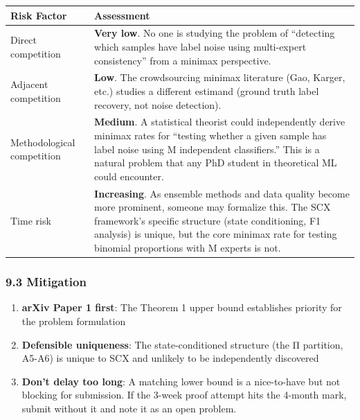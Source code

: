 \documentclass[
  12pt,
]{ctexart}
\providecommand{\tightlist}{%
  \setlength{\itemsep}{0pt}\setlength{\parskip}{0pt}}
\begin{document}
\begin{longtable}[]{@{}
  >{\raggedright\arraybackslash}p{}
  >{\raggedright\arraybackslash}p{}@{}}
\toprule\noalign{}
\begin{minipage}[b]{\linewidth}\raggedright
Risk Factor
\end{minipage} & \begin{minipage}[b]{\linewidth}\raggedright
Assessment
\end{minipage} \\
\midrule\noalign{}
\endhead
\bottomrule\noalign{}
\endlastfoot
Direct competition & \textbf{Very low}. No one is studying the problem
of ``detecting which samples have label noise using multi-expert
consistency'' from a minimax perspective. \\
Adjacent competition & \textbf{Low}. The crowdsourcing minimax
literature (Gao, Karger, etc.) studies a different estimand (ground
truth label recovery, not noise detection). \\
Methodological competition & \textbf{Medium}. A statistical theorist
could independently derive minimax rates for ``testing whether a given
sample has label noise using M independent classifiers.'' This is a
natural problem that any PhD student in theoretical ML could
encounter. \\
Time risk & \textbf{Increasing}. As ensemble methods and data quality
become more prominent, someone may formalize this. The SCX framework's
specific structure (state conditioning, F1 analysis) is unique, but the
core minimax rate for testing binomial proportions with M experts is
not. \\
\end{longtable}

\subsubsection{9.3 Mitigation}\label{mitigation}

\begin{enumerate}
\def\labelenumi{\arabic{enumi}.}
\tightlist
\item
  \textbf{arXiv Paper 1 first}: The Theorem 1 upper bound establishes
  priority for the problem formulation
\item
  \textbf{Defensible uniqueness}: The state-conditioned structure (the Π
  partition, A5-A6) is unique to SCX and unlikely to be independently
  discovered
\item
  \textbf{Don't delay too long}: A matching lower bound is a
  nice-to-have but not blocking for submission. If the 3-week proof
  attempt hits the 4-month mark, submit without it and note it as an
  open problem.
\end{enumerate}
\end{document}
